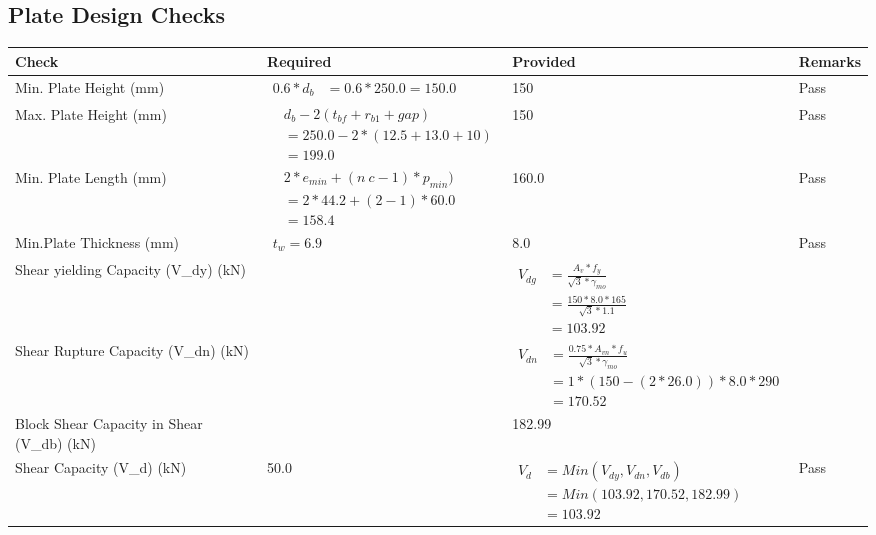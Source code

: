 \documentclass{article}%
\begin{document}
\subsection{Plate Design Checks}%
\label{subsec:PlateDesignChecks}%
\renewcommand{\arraystretch}{1.2}%
\begin{longtable}{|p{4cm}|p{5cm}|p{5.5cm}|p{1.5cm}|}%
\hline%
\rowcolor{OsdagGreen}%
Check&Required&Provided&Remarks\\%
\hline%
\endhead%
\hline%
Min. Plate Height (mm)&$\begin{aligned}0.6 * d_b&= 0.6 * 250.0=150.0\end{aligned}$&150&Pass\\%
\hline%
Max. Plate Height (mm)&$\begin{aligned} &d_b - 2 (t_{bf} + r_{b1} + gap)\\ &=250.0- 2* (12.5+13.0+ 10)\\ &=199.0\end{aligned}$&150&Pass\\%
\hline%
Min. Plate Length (mm)&$\begin{aligned} &2*e_{min} + (n~c-1) * p_{min})\\ &=2*44.2+(2-1) * 60.0\\ &=158.4\end{aligned}$&160.0&Pass\\%
\hline%
Min.Plate Thickness (mm)&$\begin{aligned} t_w=6.9\end{aligned}$&8.0&Pass\\%
\hline%
Shear yielding Capacity (V\_dy) (kN)&&$\begin{aligned} V_{dg} &= \frac{A_v*f_y}{\sqrt{3}*\gamma_{mo}}\\ &=\frac{150*8.0*165}{\sqrt{3}*1.1}\\ &=103.92\end{aligned}$&\\%
\hline%
Shear Rupture Capacity (V\_dn) (kN)&&$\begin{aligned} V_{dn} &= \frac{0.75*A_{vn}*f_u}{\sqrt{3}*\gamma_{mo}}\\ &=1*(150-(2*26.0))*8.0*290\\ &=170.52\end{aligned}$&\\%
\hline%
Block Shear Capacity in Shear (V\_db) (kN)&&182.99&\\%
\hline%
Shear Capacity (V\_d) (kN)&50.0&$\begin{aligned} V_d &= Min(V_{dy},V_{dn},V_{db})\\ &= Min(103.92,170.52,182.99)\\ &=103.92\end{aligned}$&Pass\\%

\end{longtable}
\end{document}
